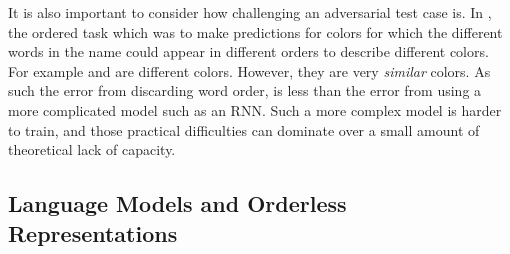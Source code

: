 \documentclass{book}
\begin{document}
It is also important to consider how challenging an adversarial test case is.
In , the ordered task which was to make predictions for colors for which the different words in the name could appear in different orders to describe different colors.
For example  and  are different colors.
However, they are very \emph{similar} colors.
As such the error from discarding word order, is less than the error from using a more complicated model such as an RNN.
Such a more complex model is harder to train, and those practical difficulties can dominate over a small amount of theoretical lack of capacity.



\subsection{Language Models and Orderless Representations}
\end{document}
